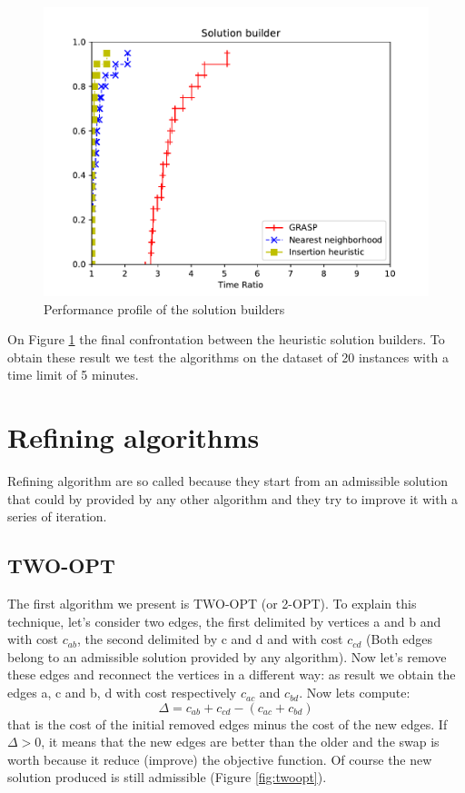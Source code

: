 \begin{figure}[h!]
	\centering
	\includegraphics[scale=0.8]{media/builder.pdf}
	\caption{Performance profile of the solution builders}
	\label{fig:solbuilder}
\end{figure}
\noindent
On Figure \ref{fig:solbuilder} the final confrontation between the heuristic solution builders. To obtain these result we test the algorithms on the dataset of 20 instances with a time limit of 5 minutes. 

\clearpage

\section{Refining algorithms}
Refining algorithm are so called because they start from an admissible solution that could by provided by any other algorithm and they try to improve it with a series of iteration.

\subsection{TWO-OPT}
The first algorithm we present is TWO-OPT (or 2-OPT). To explain this technique, let's consider two edges, the first delimited by vertices a and b and with cost $c_{ab}$, the second delimited by c and d and with cost $c_{cd}$ (Both edges belong to an admissible solution provided by any algorithm). Now let's remove these edges and reconnect the vertices in a different way: as result we obtain the edges a, c and b, d with cost respectively $c_{ac}$ and $c_{bd}$. Now lets compute: 
\begin{equation*}
\Delta = c_{ab} + c_{cd} - (c_{ac} + c_{bd})
\end{equation*}
that is the cost of the initial removed edges minus the cost of the new edges. If $\Delta > 0$, it means that the new edges are better than the older and the swap is worth because it reduce (improve) the objective function. Of course the new solution produced is still admissible (Figure \ref{fig:twoopt}).\\

